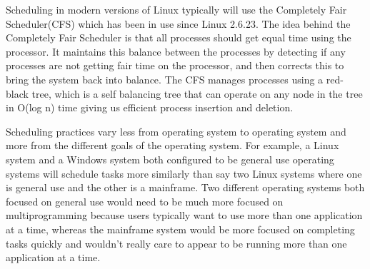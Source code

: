 \documentclass[10pt,serif,draftclsnofoot,onecolumn]{IEEEtran}
\begin{document}
	\newline
	\newline
	\par
			Scheduling in modern versions of Linux typically will use the Completely Fair Scheduler(CFS) which has been in use since Linux 2.6.23\cite{6}. The idea behind the Completely Fair Scheduler is that all processes should get equal time using the processor. It maintains this balance between the processes by detecting if any processes are not getting fair time on the processor, and then corrects this to bring the system back into balance. The CFS manages processes using a red-black tree, which is a self balancing tree that can operate on any node in the tree in O(log n) time giving us efficient process insertion and deletion\cite{6}.
	\newline
	\newline
	\par
			Scheduling practices vary less from operating system to operating system and more from the different goals of the operating system. For example, a Linux system and a Windows system both configured to be general use operating systems will schedule tasks more similarly than say two Linux systems where one is general use and the other is a mainframe. Two different operating systems both focused on general use would need to be much more focused on multiprogramming because users typically want to use more than one application at a time, whereas the mainframe system would be more focused on completing tasks quickly and wouldn't really care to appear to be running more than one application at a time. 
	\newpage


	
	
\end{document}
